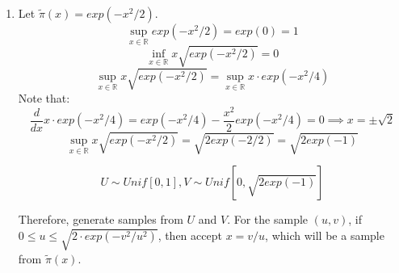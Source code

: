 \documentclass[12pt,letterpaper]{article}
\begin{document}
\begin{enumerate}[leftmargin=!,labelindent=5pt]
	\item Let $\tilde{\pi}(x) = exp(-x^2/2)$.
	$$\sup_{x \in \mathbb{R}}exp(-x^2/2) = exp(0) = 1$$
	$$ \inf_{x \in \mathbb{R}}x \sqrt{exp(-x^2/2)} = 0$$
	$$\sup_{x \in \mathbb{R}}x\sqrt{exp(-x^2/2)} =
	  \sup_{x \in \mathbb{R}}x\cdot exp(-x^2/4)
	$$
	Note that:
	$$\frac{d}{dx} x\cdot exp(-x^2/4) =
	exp(-x^2/4) - \frac{x^2}{2}exp(-x^2/4)=0 \implies
	x = \pm\sqrt2
	$$
	$$\sup_{x \in \mathbb{R}}x\sqrt{exp(-x^2/2)} = \sqrt{2exp(-2/2)}=
	\sqrt{2exp(-1)}
	$$

	$$U \sim Unif[0,1],
	V \sim Unif[0, \sqrt{2exp(-1)}]$$

	Therefore, generate samples from $U$ and $V$. For the sample $(u,v)$,
	if $0 \leq u \leq \sqrt{2\cdot exp(-v^2/u^2)}$, then accept $x = v/u$,
	which will be a sample from $\tilde{\pi}(x)$.

\end{enumerate}

\newpage
\end{document}
